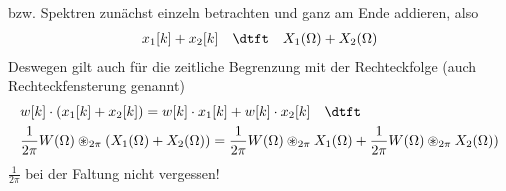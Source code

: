 \begin{Ansatz}
bzw. Spektren zunächst einzeln betrachten und ganz am Ende addieren, also
\begin{align}
x_1[k] + x_2[k] \quad\dtft\quad X_1(\Omega)+X_2(\Omega)
\end{align}
Deswegen gilt auch für die zeitliche Begrenzung mit der Rechteckfolge (auch Rechteckfensterung genannt)
\begin{align}
&w[k] \cdot (x_1[k] + x_2[k]) = w[k] \cdot x_1[k] + w[k] \cdot x_2[k]
\quad\dtft\quad\\
&\frac{1}{2\pi} W(\Omega) \circledast_{2\pi} ( X_1(\Omega)+X_2(\Omega)) = \frac{1}{2\pi} W(\Omega) \circledast_{2\pi} X_1(\Omega) + \frac{1}{2\pi} W(\Omega) \circledast_{2\pi} X_2(\Omega))
\end{align}
$\frac{1}{2\pi}$ bei der Faltung nicht vergessen!

\end{Ansatz}
